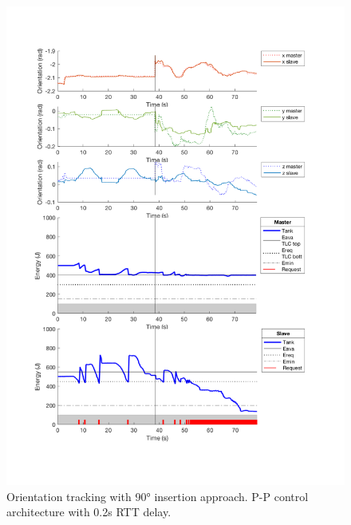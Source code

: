 \begin{center}
	\begin{figure}
		\includegraphics[width=\textwidth, keepaspectratio]{plots/pp90Delay/Orientation.pdf}
		\caption{Orientation tracking with 90° insertion approach. P-P control architecture with 0.2s RTT delay.}
		\label{graph:pp90Delay/Orientation}
	\end{figure}
\end{center}
